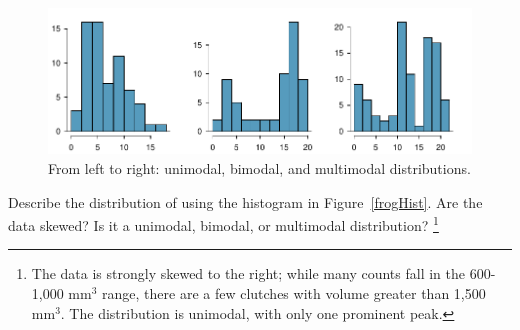\begin{doublespace}

\begin{figure}[h]
	\centering
	\includegraphics[width=\textwidth]{ch_intro_to_data_oi_biostat/figures/singleBiMultiModalPlots/singleBiMultiModalPlots}
	\caption{From left to right: unimodal, bimodal, and multimodal distributions.}
	\label{singleBiMultiModalPlots}
\end{figure}

\begin{exercise}
	Describe the distribution of  using the histogram in Figure~\ref{frogHist}. Are the data skewed? Is it a unimodal, bimodal, or multimodal distribution? \footnote{The data is strongly skewed to the right; while many counts fall in the 600-1,000 $\textrm {mm}^{3}$ range, there are a few clutches with volume greater than 1,500 $\textrm {mm}^{3}$. The distribution is unimodal, with only one prominent peak.}
\end{exercise}

\end{doublespace}
